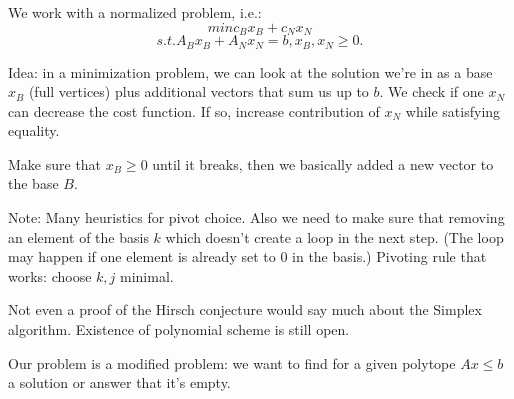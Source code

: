 







We work with a normalized problem, i.e.:
$$ min c_B x_B + c_N x_N $$
$$ s.t. A_B x_B + A_N x_N = b, x_B, x_N ≥ 0.$$

Idea: in a minimization problem, we can look at the solution we're in
as a base $x_B$ (full vertices) plus additional vectors that sum us up
to $b$. We check if one $x_N$ can decrease the cost function. If so,
increase contribution of $x_N$ while satisfying equality.

Make sure that $x_B ≥ 0$ until it breaks, then we basically
added a new vector to the base $B$. 

Note: Many heuristics for pivot choice. Also we need to make sure that
removing an element of the basis $k$ which doesn't create a loop in
the next step.  (The loop may happen if one element is already set to
$0$ in the basis.) Pivoting rule that works: choose $k,j$ minimal.


Not even a proof of the Hirsch conjecture would say much about the Simplex
algorithm. Existence of polynomial scheme is still open.


Our problem is a modified problem: we want to find for a given polytope
$Ax \leq b$ a solution or answer that it's empty.

